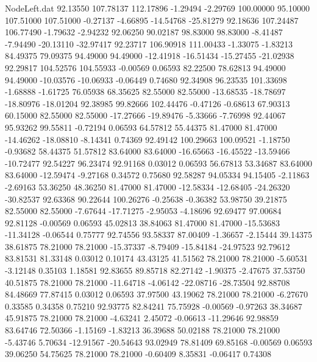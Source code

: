 \begin{filecontents}{NodeLeft.dat}
  92.13550  107.78137  112.17896    -1.29494   -2.29769  100.00000   95.10000  107.51000  107.51000   -0.27137   -4.66895  -14.54768  -25.81279
  92.18636  107.24487  106.77490    -1.79632   -2.94232   92.06250   90.02187   98.83000   98.83000   -8.41487   -7.94490  -20.13110  -32.97417
  92.23717  106.90918  111.00433    -1.33075   -1.83213   84.49375   79.09375   94.49000   94.49000  -12.41918  -16.51434  -15.27455  -21.02938
  92.29817  104.52576  104.55933    -0.00569    0.06593   82.22500   78.62813   94.49000   94.49000  -10.03576  -10.06933   -0.06449    0.74680
  92.34908   96.23535  101.33698    -1.68888   -1.61725   76.05938   68.35625   82.55000   82.55000  -13.68535  -18.78697  -18.80976  -18.01204
  92.38985   99.82666  102.44476    -0.47126   -0.68613   67.90313   60.15000   82.55000   82.55000  -17.27666  -19.89476   -5.33666   -7.76998
  92.44067   95.93262   99.55811    -0.72194    0.06593   64.57812   55.44375   81.47000   81.47000  -14.46262  -18.08810   -8.14341    0.74369
  92.49142  100.29663  100.09521    -1.18750   -0.93682   58.44375   51.57812   83.64000   83.64000  -16.65663  -16.45522  -13.59466  -10.72477
  92.54227   96.23474   92.91168     0.03012    0.06593   56.67813   53.34687   83.64000   83.64000  -12.59474   -9.27168    0.34572    0.75680
  92.58287   94.05334   94.15405    -2.11863   -2.69163   53.36250   48.36250   81.47000   81.47000  -12.58334  -12.68405  -24.26320  -30.82537
  92.63368   90.22644  100.26276    -0.25638   -0.36382   53.98750   39.21875   82.55000   82.55000   -7.67644  -17.71275   -2.95053   -4.18696
  92.69477   97.00684   92.81128    -0.00569    0.06593   45.02813   38.84063   81.47000   81.47000  -15.53683  -11.34128   -0.06544    0.75777
  92.74556   93.58337   87.00409    -1.36657   -2.15444   39.14375   38.61875   78.21000   78.21000  -15.37337   -8.79409  -15.84184  -24.97523
  92.79612   83.81531   81.33148     0.03012    0.10174   43.43125   41.51562   78.21000   78.21000   -5.60531   -3.12148    0.35103    1.18581
  92.83655   89.85718   82.27142    -1.90375   -2.47675   37.53750   40.51875   78.21000   78.21000  -11.64718   -4.06142  -22.08716  -28.73504
  92.88708   84.48669   77.87415     0.03012    0.06593   37.97500   43.19062   78.21000   78.21000   -6.27670    0.33585    0.34358    0.75210
  92.93775   82.84241   75.75928    -0.00569   -0.97263   38.34687   45.91875   78.21000   78.21000   -4.63241    2.45072   -0.06613  -11.29646
  92.98859   83.64746   72.50366    -1.15169   -1.83213   36.39688   50.02188   78.21000   78.21000   -5.43746    5.70634  -12.91567  -20.54643
  93.02949   78.81409   69.85168    -0.00569    0.06593   39.06250   54.75625   78.21000   78.21000   -0.60409    8.35831   -0.06417    0.74308

\end{filecontents}
